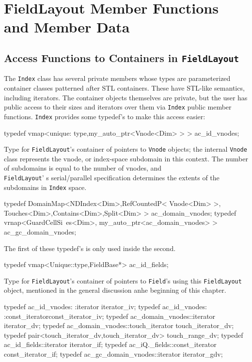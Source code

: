 \section{FieldLayout Member Functions and Member Data}
\subsection{Access Functions to Containers in \texttt{FieldLayout}}
The \texttt{Index} class has several private members whose types are parameterized container classes patterned after STL containers. These have STL-like semantics, including iterators. 
The container objects themselves are private, but the user has public access to their sizes and iterators over them via \texttt{Index} public member functions. 
\texttt{Index} provides some typedef's to make this access easier: 

\begin{smallcode}
typedef vmap<unique: type,my_auto_ptr<Vnode<Dim> > > ac_id_vnodes;
\end{smallcode}
Type for \texttt{FieldLayout}'s container of pointers to \texttt{Vnode} objects; the \ippl internal \texttt{Vnode} class represents the vnode, or index-space subdomain in this context. 
The number of subdomains is equal to the number of vnodes, and\\ \texttt{FieldLayout}' s serial/parallel specification determines the extents of the subdomains in \texttt{Index} space.


 
\begin{smallcode}
typedef DomainMap<NDIndex<Dim>,RefCountedP< Vnode<Dim> >, 
Touches<Dim>,Contains<Dim>,Split<Dim> > ac_domain_vnodes; 
typedef vrnap<GuardCellSi~es<Dim>, my_auto_ptr<ac_domain_vnodes> > ac_gc_domain_vnodes; 
\end{smallcode}
The first of these typedef's is only used inside the second. 
\begin{smallcode}
typedef vmap<Unique::type,FieldBase*> ac_id_fields;
\end{smallcode}
Type for \texttt{FieldLayout}'s container of pointers to \texttt{Field}'s using this \texttt{FieldLayout} object, mentioned in the general discussion anhe beginning of this chapter. 

\begin{smallcode}
typedef ac_id_vnodes: :iterator iterator_iv;
typedef ac_id_vnodes: :const_iteratorconst_iterator_iv;
typedef ac_domain_vnodes::iterator iterator_dv;
typedef ac_domain_vnodes::touch_iterator touch_iterator_dv;
typedef pair<touch_iterator_dv,touch_iterator_dv> touch_range_dv;
typedef ac_id_fields::iterator iterator_if;
typedef ac_iQ._fields::const_iterator const_iterator_if; 
typedef ac_gc_domain_vnodes::iterator iterator_gdv;
\end{smallcode}

